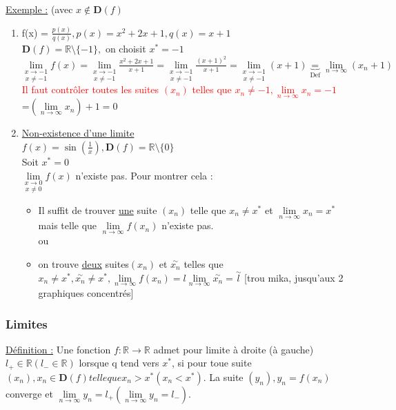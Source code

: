 \documentclass[12pt,a4paper]{article}
\newcommand{\limite}{\lim\limits_}
\newcommand{\ninf}{\ensuremath{n \to \infty}}
\newcommand{\R}{\ensuremath{\mathbb{R}} }
\newcommand{\rtor}{\ensuremath{\R \to \R} }
\begin{document}
{\underline{Exemple :} (avec $x \not \in \mathbf{D}(f)$
\begin{enumerate}
\item f(x) = $\frac{p(x)}{q(x)}, p(x) = x^2+2x+1, q(x) = x+1$\\
$\mathbf{D}(f) = \R \setminus \{-1\},$ on choisit $x^* = -1$\\
$\underset{x \neq -1}{\lim\limits_{x \to -1}} f(x) = \underset{x \neq -1}{\lim\limits_{x \to -1}} \frac{x^2+2x+1}{x+1} = \underset{x \neq -1}{\lim\limits_{x \to -1}} \frac{(x+1)^2}{x+1} = \underset{x \neq -1}{\lim\limits_{x \to -1}} (x+1) \underbrace{=}_{\mbox{Def}} \limite{\ninf} (x_n+1)$ \textcolor{red}{Il faut contrôler toutes les suites $(x_n)$ telles que $x_n \neq -1,\limite{\ninf} x_n = -1$}\\
=$(\limite{\ninf} x_n) +1 = 0$
\item \underline{Non-existence d'une limite}\\
$f(x) = \sin(\frac{1}{x}), \mathbf{D}(f) = \R\setminus\{0\}$\\
Soit $x^* = 0$\\
$\underset{x \neq 0}{\lim\limits_{x \to 0}} f(x)$ n'existe pas. Pour montrer cela :
\begin{itemize}
\item Il suffit de trouver \underline{une} suite $(x_n)$ telle que $x_n \neq x^*$ et $ \limite{\ninf} x_n = x^*$ mais telle que $\limite{\ninf}f(x_n)$ n'existe pas.\\
ou
\item  on trouve \underline{deux} suites$(x_n)$ et $\overset{\sim}{x_n}$ telles que $x_n \neq x^*, \overset{\sim}{x_n} \neq x^*, \limite{\ninf} f(x_n) = l \limite{\ninf} \overset{\sim}{x_n} = \overset{\sim}{l}$
[trou mika, jusqu'aux 2 graphiques concentrés]
\end{itemize}
\end{enumerate}
\subsubsection{Limites}


\begin{boite}
\underline{Définition :} Une fonction $f: \rtor$ admet pour limite à droite (à gauche) $l_+ \in \R (l_- \in \R)$ lorsque q tend vers $x^*$, si pour toue suite $(x_n), x_n \in \mathbf{D}(f) telle que x_n > x^* (x_n < x^*)$. La suite $(y_n), y_n = f(x_n)$ converge et $\limite{\ninf} y_n = l_+ (\limite{\ninf} y_n = l_-)$.
\end{boite}

}
\end{document}
